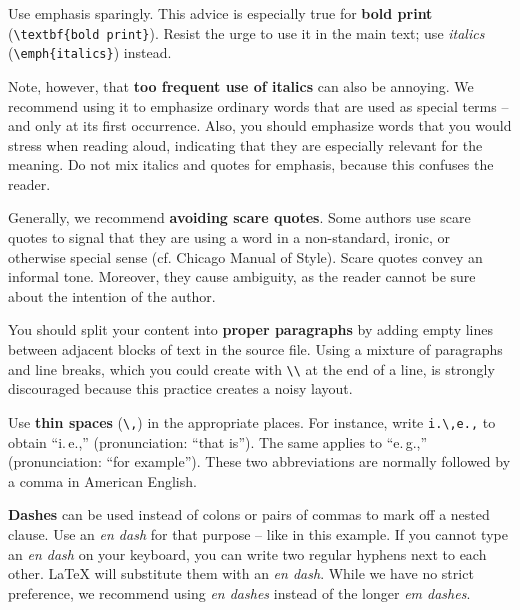 Use emphasis sparingly. This advice is especially true for \textbf{bold print} (\verb|\textbf{bold print}|).%
Resist the urge to use it in the main text; use \emph{italics} (\verb|\emph{italics}|) instead.

Note, however, that \textbf{too frequent use of italics} can also be annoying.
We recommend using it to emphasize ordinary words that are used as special terms – and only at its first occurrence. Also, you should emphasize words that you would stress when reading aloud, indicating that they are especially relevant for the meaning. Do not mix italics and quotes for emphasis, because this confuses the reader.


Generally, we recommend \textbf{avoiding scare quotes}.%
Some authors use scare quotes to signal that they are using a word in a non-standard, ironic, or otherwise special sense (cf. Chicago Manual of Style). Scare quotes convey an informal tone. Moreover, they cause ambiguity, as the reader cannot be sure about the intention of the author.

You should split your content into \textbf{proper paragraphs} by adding empty lines between adjacent blocks of text in the source file. Using a mixture of paragraphs and line breaks, which you could create with \verb|\\| at the end of a line, is strongly discouraged because this practice creates a noisy layout.

Use \textbf{thin spaces} (\verb|\,|) in the appropriate places. For instance, write \verb|i.\,e.,| to obtain ``i.\,e.,'' (pronunciation: ``that is''). The same applies to ``e.\,g.,'' (pronunciation: ``for example''). These two abbreviations are normally followed by a comma in American English.

\textbf{Dashes} can be used instead of colons or pairs of commas to mark off a nested clause. Use an \emph{en dash} for that purpose -- like in this example. If you cannot type an \emph{en dash} on your keyboard, you can write two regular hyphens next to each other. LaTeX will substitute them with an \emph{en dash}. While we have no strict preference, we recommend using \emph{en dashes} instead of the longer \emph{em dashes}.

